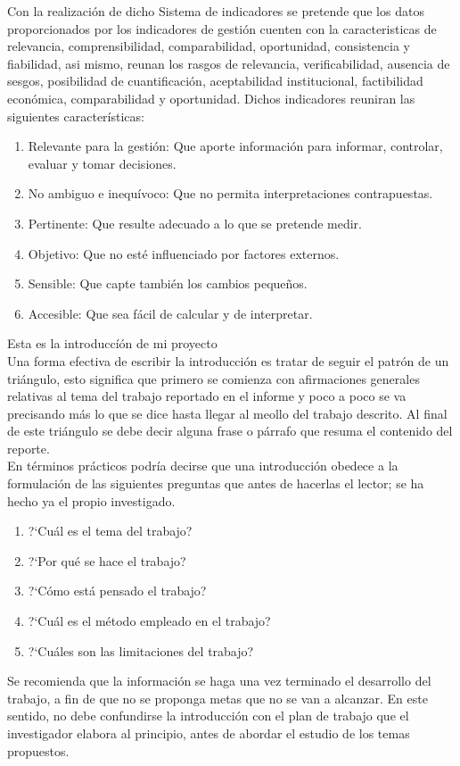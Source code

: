 	Con la realizaci\'on de dicho Sistema de indicadores se pretende que los datos proporcionados por los indicadores de gesti\'on cuenten con la caracteristicas de relevancia, comprensibilidad, comparabilidad, oportunidad, consistencia y fiabilidad, asi mismo, reunan los rasgos de relevancia, verificabilidad, ausencia de sesgos, posibilidad de cuantificaci\'on, aceptabilidad institucional, factibilidad econ\'omica, comparabilidad y oportunidad. Dichos indicadores reuniran las siguientes caracter\'isticas:\\

	\begin{enumerate}
		\item  Relevante para la gesti\'on: Que aporte informaci\'on para informar, controlar, evaluar y tomar decisiones.
		\item  No ambiguo e inequ\'ivoco: Que no permita interpretaciones contrapuestas.
		\item  Pertinente: Que resulte adecuado a lo que se pretende medir.
		\item  Objetivo: Que no est\'e influenciado por factores externos.
		\item  Sensible: Que capte tambi\'en los cambios peque\~nos.
		\item  Accesible: Que sea f\'acil de calcular y de interpretar.
	\end{enumerate}




	Esta es la introducc\'i\'on de mi proyecto\\
	
	Una forma efectiva de escribir la introducci\'on es tratar de seguir
	el patr\'on de un tri\'angulo, esto significa que primero se comienza con afirmaciones generales
	relativas al tema del trabajo reportado en el informe y poco a poco se va precisando m\'as
	lo que se dice hasta llegar al meollo del trabajo descrito. Al final de este tri\'angulo se debe
	decir alguna frase o p\'arrafo que resuma el contenido del reporte.\\
	
	En t\'erminos pr\'acticos podr\'ia decirse que una introducci\'on obedece a la formulaci\'on de las siguientes preguntas que antes de hacerlas el lector; se ha hecho ya el propio investigado.
	\begin{enumerate}
		\item  ?`Cu\'al es el tema del trabajo?
		\item  ?`Por qu\'e se hace el trabajo?
		\item  ?`C\'omo est\'a pensado el trabajo?
		\item  ?`Cu\'al es el m\'etodo empleado en el trabajo?
		\item  ?`Cu\'ales son las limitaciones del trabajo?
	\end{enumerate}
	Se recomienda que la informaci\'on se haga una vez terminado el desarrollo del trabajo, a fin de que no se proponga metas que no se van a alcanzar. En este sentido, no debe confundirse la introducci\'on con el plan de trabajo que el investigador elabora al principio, antes de abordar el estudio de los temas propuestos.\\ 
	
